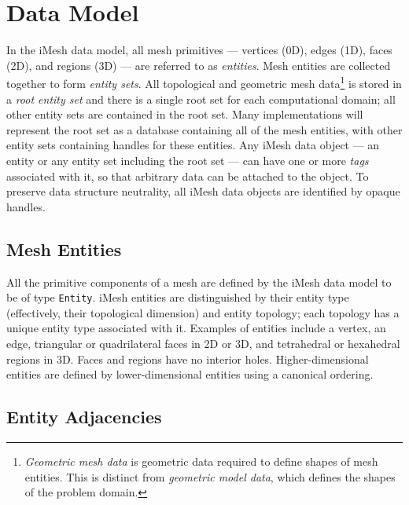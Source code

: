 
\section{Data Model\label{sec:Data-Model}}

In the iMesh data model, all mesh primitives --- vertices (0D),
edges (1D), faces (2D), and regions (3D) --- are referred to as
\emph{entities}.  Mesh entities are collected together to form
\emph{entity sets}. All topological and geometric mesh
data\footnote{\emph{Geometric mesh data} is geometric data required to
define shapes of mesh entities. This is distinct from \emph{geometric
model data}, which defines the shapes of the problem domain.} is stored
in a \emph{root entity set} and there is a single root set for each
computational domain; all other entity sets are contained in the root
set. Many implementations will represent the root set as a database
containing all of the mesh entities, with other entity sets containing
handles for these entities.  Any iMesh data object --- an entity or
any entity set including the root set --- can have one or more
\emph{tags} associated with it, so that arbitrary data can be attached
to the object. To preserve data structure neutrality, all iMesh data
objects are identified by opaque handles.


\subsection{Mesh Entities\label{sub:Mesh-Entities}}

All the primitive components of a mesh are defined by the iMesh data
model to be of type \texttt{Entity}. iMesh entities are
distinguished by their entity type (effectively, their topological
dimension) and entity topology; each topology has a unique entity type
associated with it. Examples of entities include a vertex, an edge,
triangular or quadrilateral faces in 2D or 3D, and tetrahedral or
hexahedral regions in 3D. Faces and regions have no interior holes.
Higher-dimensional entities are defined by lower-dimensional entities
using a canonical ordering.


\subsection{Entity Adjacencies\label{sub:Entity-Adjacencies}}

